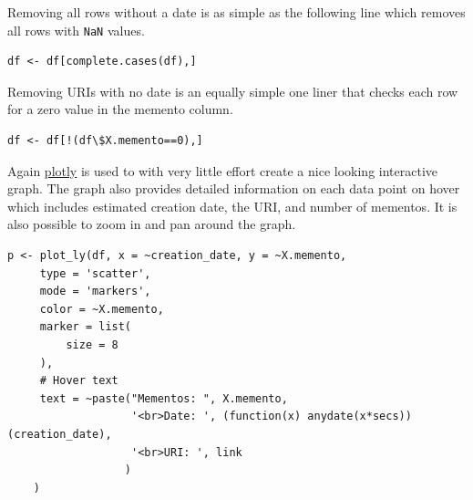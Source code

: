 \documentclass[12pt, a4paper]{article}
\newcommand{\code}[1]{\texttt{#1}}
\begin{document}
\newpage
\noindent
Removing all rows without a date is as simple as the following
line which removes all rows with \code{NaN} values.

\begin{minipage}{\linewidth} %
\vspace{2em}
\begin{verbatim}
df <- df[complete.cases(df),]
\end{verbatim}
\vspace{2em}
\end{minipage}

\noindent
Removing URIs with no date is an equally simple one liner that
checks each row for a zero value in the memento column.

\begin{minipage}{\linewidth} %
\vspace{2em}
\begin{verbatim}
df <- df[!(df\$X.memento==0),]
\end{verbatim}
\vspace{2em}
\end{minipage}

Again \href{https://plot.ly}{plotly} is used to with very little
effort create a nice looking interactive graph. The graph also
provides detailed information on each data point on hover which
includes estimated creation date, the URI, and number of mementos.
It is also possible to zoom in and pan around the graph.

\begin{minipage}{\linewidth} %
\vspace{2em}
\begin{verbatim}
p <- plot_ly(df, x = ~creation_date, y = ~X.memento,
     type = 'scatter',
     mode = 'markers',
     color = ~X.memento,
     marker = list(
         size = 8
     ),
     # Hover text
     text = ~paste("Mementos: ", X.memento,
                   '<br>Date: ', (function(x) anydate(x*secs))(creation_date),
                   '<br>URI: ', link
                  )
    )
\end{verbatim}
\end{minipage}
\end{document}
